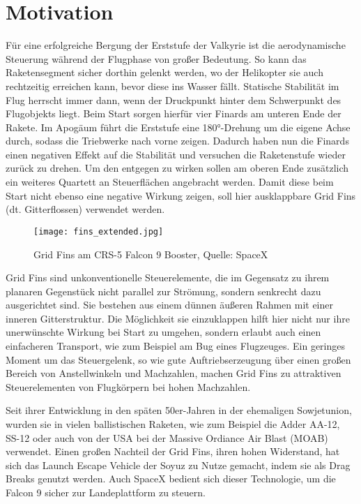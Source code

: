 \section{Motivation}
Für eine erfolgreiche Bergung der Erststufe der Valkyrie ist die aerodynamische Steuerung während der Flugphase von großer Bedeutung. So kann das Raketensegment sicher dorthin gelenkt werden, wo der Helikopter sie auch rechtzeitig erreichen kann, bevor diese ins Wasser fällt. Statische Stabilität im Flug herrscht immer dann, wenn der Druckpunkt hinter dem Schwerpunkt des Flugobjekts liegt. Beim Start sorgen hierfür vier Finards am unteren Ende der Rakete. Im Apogäum führt die Erststufe eine 180°-Drehung um die eigene Achse durch, sodass die Triebwerke nach vorne zeigen. Dadurch haben nun die Finards einen negativen Effekt auf die Stabilität und versuchen die Raketenstufe wieder zurück zu drehen. Um den entgegen zu wirken sollen am oberen Ende zusätzlich ein weiteres Quartett an Steuerflächen angebracht werden. Damit diese beim Start nicht ebenso eine negative Wirkung zeigen, soll hier ausklappbare Grid Fins (dt. Gitterflossen) verwendet werden.

\begin{figure}[h]
	\centering
	\texttt{[image: fins\_extended.jpg]}
	\caption{Grid Fins am CRS-5 Falcon 9 Booster, Quelle: SpaceX}
\end{figure}

Grid Fins sind unkonventionelle Steuerelemente, die im Gegensatz zu ihrem planaren Gegenstück nicht parallel zur Strömung, sondern senkrecht dazu ausgerichtet sind. Sie bestehen aus einem dünnen äußeren Rahmen mit einer inneren Gitterstruktur. Die Möglichkeit sie einzuklappen hilft hier nicht nur ihre unerwünschte Wirkung bei Start zu umgehen, sondern erlaubt auch einen einfacheren Transport, wie zum Beispiel am Bug eines Flugzeuges. Ein geringes Moment um das Steuergelenk, so wie gute Auftriebserzeugung über einen großen Bereich von Anstellwinkeln und Machzahlen\cite{vergleichPlanar}, machen Grid Fins zu attraktiven Steuerelementen von Flugkörpern bei hohen Machzahlen.

Seit ihrer Entwicklung in den späten 50er-Jahren in der ehemaligen Sowjetunion, wurden sie in vielen ballistischen Raketen, wie zum Beispiel die Adder AA-12, SS-12 oder auch von der USA bei der Massive Ordiance Air Blast (MOAB) verwendet. Einen großen Nachteil der Grid Fins, ihren hohen Widerstand, hat sich das Launch Escape Vehicle der Soyuz zu Nutze gemacht, indem sie als Drag Breaks genutzt werden. Auch SpaceX bedient sich dieser Technologie, um die Falcon 9 sicher zur Landeplattform zu steuern\cite{sehnenlaenge}.

